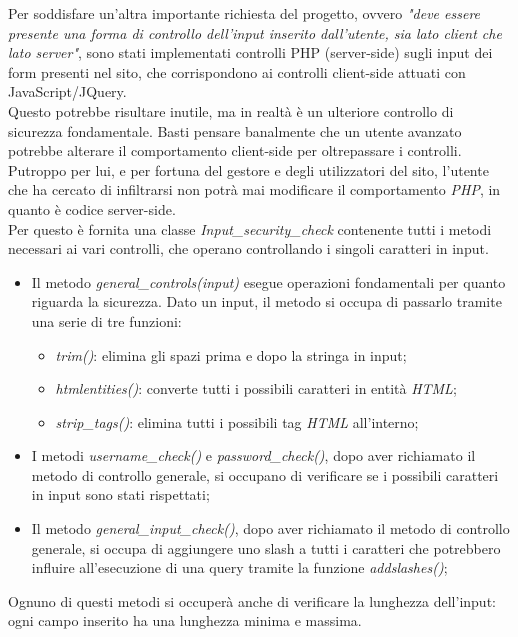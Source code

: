 Per soddisfare un'altra importante richiesta del progetto, ovvero \emph{"deve essere presente una forma di controllo dell’input inserito dall’utente, 
sia lato client che lato server"}, sono stati implementati controlli PHP (server-side) sugli input dei form presenti nel sito, che corrispondono ai 
controlli client-side attuati con JavaScript/JQuery.\\
Questo potrebbe risultare inutile, ma in realtà è un ulteriore controllo di sicurezza fondamentale. Basti pensare banalmente che un utente
avanzato potrebbe alterare il comportamento client-side per oltrepassare i controlli. Putroppo per lui, e per fortuna del gestore e degli
utilizzatori del sito, l'utente che ha cercato di infiltrarsi non potrà mai modificare il comportamento \emph{PHP}, in quanto è codice server-side.\\
Per questo è fornita una classe \emph{Input\_security\_check} contenente tutti i metodi necessari ai vari controlli, che operano controllando 
i singoli caratteri in input.
\begin{itemize}
    \item Il metodo \emph{general\_controls(input)} esegue operazioni fondamentali per quanto riguarda la sicurezza. Dato un input, il metodo si 
    occupa di passarlo tramite una serie di tre funzioni: 
    \begin{itemize}
        \item \emph{trim()}: elimina gli spazi prima e dopo la stringa in input;
        \item \emph{htmlentities()}: converte tutti i possibili caratteri in entità \emph{HTML};
        \item \emph{strip\_tags()}: elimina tutti i possibili tag \emph{HTML} all'interno;
    \end{itemize}
    \item I metodi \emph{username\_check()} e \emph{password\_check()}, dopo aver richiamato il metodo di controllo generale, si occupano di 
    verificare se i possibili caratteri in input sono stati rispettati;
    \item Il metodo \emph{general\_input\_check()}, dopo aver richiamato il metodo di controllo generale, si occupa di aggiungere uno slash a 
    tutti i caratteri che potrebbero influire all'esecuzione di una query tramite la funzione \emph{addslashes()};
\end{itemize}

Ognuno di questi metodi si occuperà anche di verificare la lunghezza dell'input: ogni campo inserito ha una lunghezza minima e massima.\\